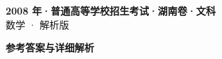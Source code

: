 \documentclass[zihao=-4, a4paper]{ctexart}
\begin{document}
\begin{center}
  {\Large\bfseries 2008 年·普通高等学校招生考试·湖南卷·文科}\\[4pt]
  {\large 数学 · 解析版}
\end{center}
\medskip
{}

\clearpage
{}
\begin{center}{\Large\bfseries 参考答案与详细解析}\end{center}
\medskip

\end{document}
